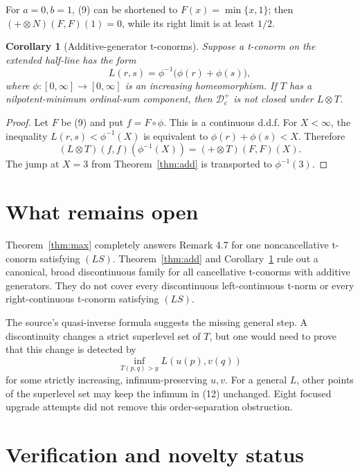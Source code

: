 \documentclass[11pt]{article}
\newtheorem{corollary}[theorem]{Corollary}
\theoremstyle{remark}
\newcommand{\Dc}{\mathcal D_c^+}
\newcommand{\tens}{\mathbin{\otimes}}
\begin{document}
For \(a=0,b=1\), (9) can be shortened to \(F(x)=\min\{x,1\}\); then
\((+\tens N)(F,F)(1)=0\), while its right limit is at least \(1/2\).

\begin{corollary}[Additive-generator t-conorms]
\label{cor:generator}
Suppose a t-conorm on the extended half-line has the form
\[
 L(r,s)=\phi^{-1}\bigl(\phi(r)+\phi(s)\bigr),                  \tag{11}
\]
where \(\phi:[0,\infty]\to[0,\infty]\) is an increasing homeomorphism.
If \(T\) has a nilpotent-minimum ordinal-sum component, then \(\Dc\) is not
closed under \(L\tens T\).
\end{corollary}

\begin{proof}
Let \(F\) be (9) and put \(f=F\circ\phi\).  This is a continuous d.d.f.
For \(X<\infty\), the inequality
\(L(r,s)<\phi^{-1}(X)\) is equivalent to
\(\phi(r)+\phi(s)<X\).  Therefore
\[
 (L\tens T)(f,f)(\phi^{-1}(X))=(+\tens T)(F,F)(X).
\]
The jump at \(X=3\) from Theorem~\ref{thm:add} is transported to
\(\phi^{-1}(3)\).
\end{proof}

\section{What remains open}

Theorem~\ref{thm:max} completely answers Remark 4.7 for one noncancellative
t-conorm satisfying \((LS)\).  Theorem~\ref{thm:add} and
Corollary~\ref{cor:generator} rule out a canonical, broad discontinuous
family for all cancellative t-conorms with additive generators.  They do not
cover every discontinuous left-continuous t-norm or every right-continuous
t-conorm satisfying \((LS)\).

The source's quasi-inverse formula suggests the missing general step.  A
discontinuity changes a strict superlevel set of \(T\), but one would need to
prove that this change is detected by
\[
 \inf_{T(p,q)>y}L(u(p),v(q))                                   \tag{12}
\]
for some strictly increasing, infimum-preserving \(u,v\).  For a general
\(L\), other points of the superlevel set may keep the infimum in (12)
unchanged.  Eight focused upgrade attempts did not remove this
order-separation obstruction.

\section{Verification and novelty status}
\end{document}
